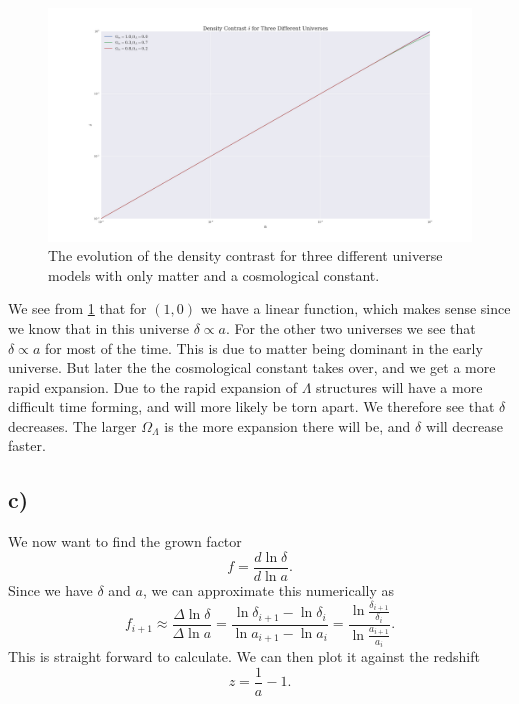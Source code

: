 \documentclass[a4paper,norsk, 10pt]{article}
\begin{document}
\begin{figure}[!h]
\centering
\includegraphics[scale=0.25]{a_v_delta}
\caption{The evolution of the density contrast for three different universe models with only matter and a cosmological constant.}\label{fig:a_v_delta}
\end{figure}


We see from \ref{fig:a_v_delta} that for $(1,0)$ we have a linear function, which makes sense since we know that in this universe $\delta \propto a$. For the other two universes we see that $\delta \propto a$ for most of the time. This is due to matter being dominant in the early universe. But later the the cosmological constant takes over, and we get a more rapid expansion. Due to the rapid expansion of $\Lambda$ structures will have a more difficult time forming, and will more likely be torn apart. We therefore see that $\delta$ decreases. The larger $\Omega_{\Lambda}$ is the more expansion there will be, and $\delta$ will decrease faster.

\subsection{c)}
We now want to find the grown factor 
\begin{equation}\label{eq:f}
f = \frac{d\ln \delta}{d\ln a}.
\end{equation}
Since we have $\delta$ and $a$, we can approximate this numerically as
\begin{equation}
f_{i+1} \approx \frac{\Delta \ln \delta}{\Delta \ln a} = \frac{\ln \delta_{i+1} - \ln \delta_{i}}{\ln a_{i+1} - \ln a_{i}} = \frac{\ln \frac{\delta_{i+1}}{\delta_{i}}}{\ln \frac{a_{i+1}}{a_{i}}}.
\end{equation}
This is straight forward to calculate. We can then plot it against the redshift
\begin{equation}
z = \frac{1}{a} - 1.
\end{equation}
\end{document}
